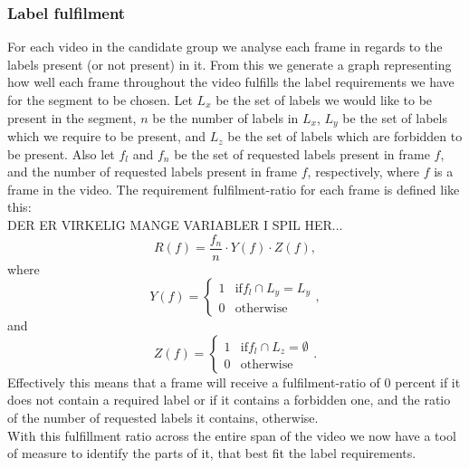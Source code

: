 \subsubsection{Label fulfilment}
%
For each video in the candidate group we analyse each frame in regards to the labels present (or not present) in it. From this we generate a graph representing how well each frame throughout the video fulfills the label requirements we have for the segment to be chosen. Let $L_{x}$ be the set of labels we would like to be present in the segment, $n$ be the number of labels in $L_{x}$, $L_{y}$ be the set of labels which we require to be present, and $L_{z}$ be the set of labels which are forbidden to be present. Also let $f_{l}$ and $f_{n}$ be the set of requested labels present in frame $f$, and the number of requested labels present in frame $f$, respectively, where $f$ is a frame in the video. The requirement fulfilment-ratio for each frame is defined like this:\\
DER ER VIRKELIG MANGE VARIABLER I SPIL HER...
%
\begin{equation}
R(f) = \frac{f_{n}}{n} \cdot Y(f) \cdot Z(f),
\end{equation} 
%
where
%
\begin{equation}
Y(f) =
\begin{cases}
1 & \text{if} f_{l} \cap L_{y} = L_{y}\\
0 &  \text{otherwise}
\end{cases},
\end{equation} 
%
and
%
\begin{equation}
Z(f) =
\begin{cases}
1 & \text{if} f_{l} \cap L_{z} = \emptyset\\
0 &  \text{otherwise}
\end{cases}.
\end{equation} 
%
Effectively this means that a frame will receive a fulfilment-ratio of 0 percent if it does not contain a required label or if it contains a forbidden one, and the ratio of the number of requested labels it contains, otherwise.\\
%
With this fulfillment ratio across the entire span of the video we now have a tool of measure to identify the parts of it, that best fit the label requirements.
%
